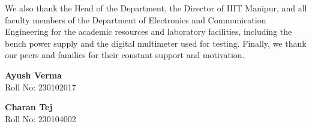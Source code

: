 \documentclass[12pt,a4paper]{report}
\begin{document}
We also thank the Head of the Department, the Director of IIIT Manipur, and all faculty members of the Department of Electronics and Communication Engineering for the academic resources and laboratory facilities, including the bench power supply and the digital multimeter used for testing. Finally, we thank our peers and families for their constant support and motivation.

\vspace{1.5cm}
\noindent
\begin{minipage}[t]{0.48\textwidth}
\raggedright
\textbf{Ayush Verma}\\
Roll No: 230102017
\end{minipage}\hfill
\begin{minipage}[t]{0.48\textwidth}
\raggedleft
\textbf{Charan Tej}\\
Roll No: 230104002
\end{minipage}

\clearpage
\tableofcontents
\clearpage
\listoftables
\clearpage
\listoffigures

\end{document}
